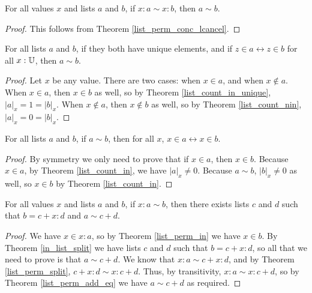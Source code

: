 \documentclass[../../math.tex]{subfiles}
\begin{document}
\begin{theorem} \label{list_perm_add_eq}
    For all values $x$ and lists $a$ and $b$, if $x : a \sim x : b$, then $a
    \sim b$.
\end{theorem}
\begin{proof}
    This follows from Theorem \ref{list_perm_conc_lcancel}.
\end{proof}

\begin{theorem} \label{list_in_unique_perm}
    For all lists $a$ and $b$, if they both have unique elements, and if $z \in
    a \leftrightarrow z \in b$ for all $x : \mathbb{U}$, then $a \sim b$.
\end{theorem}
\begin{proof}
    Let $x$ be any value.  There are two cases: when $x \in a$, and when $x
    \notin a$.  When $x \in a$, then $x \in b$ as well, so by Theorem
    \ref{list_count_in_unique}, $|a|_x = 1 = |b|_x$.  When $x \notin a$, then $x
    \notin b$ as well, so by Theorem \ref{list_count_nin}, $|a|_x = 0 = |b|_x$.
\end{proof}

\begin{theorem} \label{list_perm_in}
    For all lists $a$ and $b$, if $a \sim b$, then for all $x$, $x \in a
    \leftrightarrow x \in b$.
\end{theorem}
\begin{proof}
    By symmetry we only need to prove that if $x \in a$, then $x \in b$.
    Because $x \in a$, by Theorem \ref{list_count_in}, we have $|a|_x \neq 0$.
    Because $a \sim b$, $|b|_x \neq 0$ as well, so $x \in b$ by Theorem
    \ref{list_count_in}.
\end{proof}

\begin{theorem} \label{list_perm_split_eq}
    For all values $x$ and lists $a$ and $b$, if $x : a \sim b$, then there
    exists lists $c$ and $d$ such that $b = c + x : d$ and $a \sim c + d$.
\end{theorem}
\begin{proof}
    We have $x \in x : a$, so by Theorem \ref{list_perm_in} we have $x \in b$.
    By Theorem \ref{in_list_split} we have lists $c$ and $d$ such that $b = c +
    x : d$, so all that we need to prove is that $a \sim c + d$.  We know that
    $x : a \sim c + x : d$, and by Theorem \ref{list_perm_split}, $c + x : d
    \sim x : c + d$.  Thus, by transitivity, $x : a \sim x : c + d$, so by
    Theorem \ref{list_perm_add_eq} we have $a \sim c + d$ as required.
\end{proof}
\end{document}
